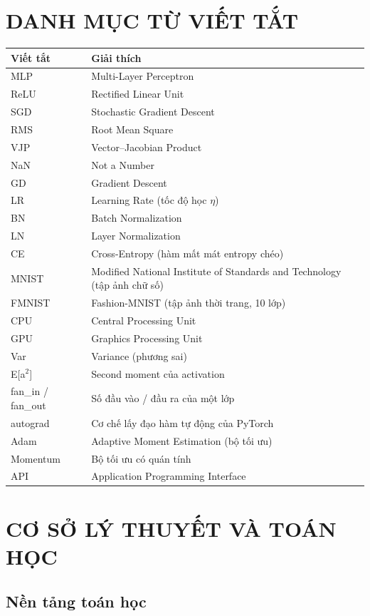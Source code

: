 \documentclass[12pt,a4paper]{report}
\begin{document}
\chapter*{DANH MỤC TỪ VIẾT TẮT}
\begin{tabularx}{\textwidth}{lX}
\toprule
Viết tắt & Giải thích \\
\midrule
MLP & Multi-Layer Perceptron \\
ReLU & Rectified Linear Unit \\
SGD & Stochastic Gradient Descent \\
RMS & Root Mean Square \\
VJP & Vector--Jacobian Product \\
NaN & Not a Number \\
GD & Gradient Descent \\
LR & Learning Rate (tốc độ học $\eta$) \\
BN & Batch Normalization \\
LN & Layer Normalization \\
CE & Cross-Entropy (hàm mất mát entropy chéo) \\
MNIST & Modified National Institute of Standards and Technology (tập ảnh chữ số) \\
FMNIST & Fashion-MNIST (tập ảnh thời trang, 10 lớp) \\
CPU & Central Processing Unit \\
GPU & Graphics Processing Unit \\
Var & Variance (phương sai) \\
E[a$^2$] & Second moment của activation \\
fan\_in / fan\_out & Số đầu vào / đầu ra của một lớp \\
autograd & Cơ chế lấy đạo hàm tự động của PyTorch \\
Adam & Adaptive Moment Estimation (bộ tối ưu) \\
Momentum & Bộ tối ưu có quán tính \\
API & Application Programming Interface \\
\bottomrule
\end{tabularx}
\clearpage
\listoffigures
\clearpage
\listoftables
\clearpage
\tableofcontents
\clearpage
\chapter{CƠ SỞ LÝ THUYẾT VÀ TOÁN HỌC}
\section{Nền tảng toán học}
\end{document}

